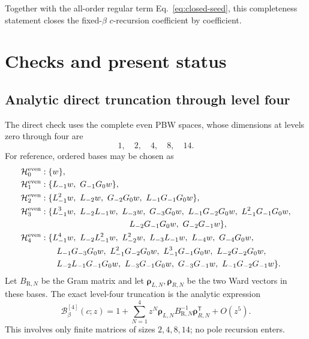 \documentclass[11pt]{article}
\newcommand{\R}{\mathrm R}
\newcommand{\B}{\mathcal B}
\begin{document}
Together with the all-order regular term
Eq.~\eqref{eq:closed-seed}, this completeness statement closes the
fixed-\(\beta\) \(c\)-recursion coefficient by coefficient.

\section{Checks and present status}

\subsection{Analytic direct truncation through level four}

The direct check uses the complete even PBW spaces, whose dimensions at
levels zero through four are
\[
 1,\quad2,\quad4,\quad8,\quad14.
\]
For reference, ordered bases may be chosen as
\begin{align*}
\mathcal H_0^{\rm even}:{}&
 \{w\},\\
\mathcal H_1^{\rm even}:{}&
 \{L_{-1}w,\ G_{-1}G_0w\},\\
\mathcal H_2^{\rm even}:{}&
 \{L_{-1}^2w,\ L_{-2}w,\ G_{-2}G_0w,\
    L_{-1}G_{-1}G_0w\},\\
\mathcal H_3^{\rm even}:{}&
 \{L_{-1}^3w,\ L_{-2}L_{-1}w,\ L_{-3}w,\ G_{-3}G_0w,\
 L_{-1}G_{-2}G_0w,\ L_{-1}^2G_{-1}G_0w,\\
&\hspace{34mm}L_{-2}G_{-1}G_0w,\ G_{-2}G_{-1}w\},\\
\mathcal H_4^{\rm even}:{}&
 \{L_{-1}^4w,\ L_{-2}L_{-1}^2w,\ L_{-2}^2w,\
 L_{-3}L_{-1}w,\ L_{-4}w,\ G_{-4}G_0w,\\
&\quad L_{-1}G_{-3}G_0w,\ L_{-1}^2G_{-2}G_0w,\
 L_{-1}^3G_{-1}G_0w,\ L_{-2}G_{-2}G_0w,\\
&\quad L_{-2}L_{-1}G_{-1}G_0w,\ L_{-3}G_{-1}G_0w,\
 G_{-3}G_{-1}w,\ L_{-1}G_{-2}G_{-1}w\}.
\end{align*}
Let \(B_{\R,N}\) be the Gram matrix and let
\(\bm\rho_{L,N},\bm\rho_{R,N}\) be the two Ward vectors in these
bases.  The exact level-four truncation is the analytic expression
\begin{equation}
 \B_\beta^{[4]}(c;z)
 =1+\sum_{N=1}^{4}z^N
 \bm\rho_{L,N}B_{\R,N}^{-1}\bm\rho_{R,N}^{\mathsf T}
 +O(z^5).
 \label{eq:analytic-level-four-truncation}
\end{equation}
This involves only finite matrices of sizes \(2,4,8,14\); no pole
recursion enters.
\end{document}
